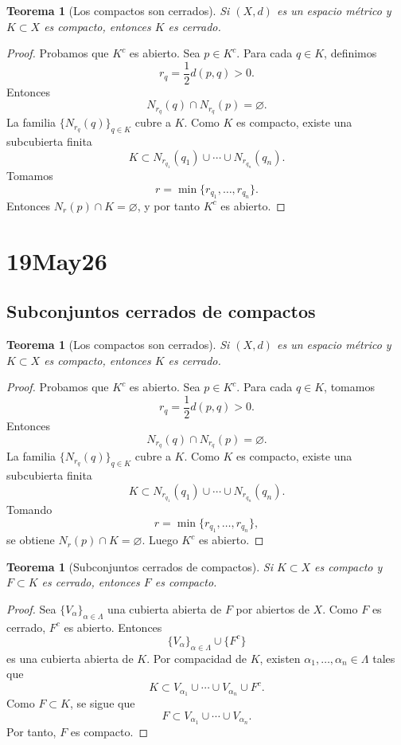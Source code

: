 \documentclass[12pt]{article}
\theoremstyle{definition}
\theoremstyle{plain}
\newtheorem{theorem}[definition]{Teorema}
\theoremstyle{remark}
\begin{document}
\begin{theorem}[Los compactos son cerrados]
Si $(X,d)$ es un espacio métrico y $K\subset X$ es compacto, entonces $K$ es cerrado.
\end{theorem}

\begin{proof}
Probamos que $K^c$ es abierto.
Sea $p\in K^c$.
Para cada $q\in K$, definimos
\[
r_q=\frac12 d(p,q)>0.
\]
Entonces
\[
N_{r_q}(q)\cap N_{r_q}(p)=\varnothing.
\]
La familia $\{N_{r_q}(q)\}_{q\in K}$ cubre a $K$.
Como $K$ es compacto, existe una subcubierta finita
\[
K\subset N_{r_{q_1}}(q_1)\cup\cdots\cup N_{r_{q_n}}(q_n).
\]
Tomamos
\[
r=\min\{r_{q_1},\dots,r_{q_n}\}.
\]
Entonces $N_r(p)\cap K=\varnothing$, y por tanto $K^c$ es abierto.
\end{proof}

\section*{19May26}

\subsection*{Subconjuntos cerrados de compactos}

\begin{theorem}[Los compactos son cerrados]
Si $(X,d)$ es un espacio métrico y $K\subset X$ es compacto, entonces $K$ es cerrado.
\end{theorem}

\begin{proof}
Probamos que $K^c$ es abierto.
Sea $p\in K^c$. Para cada $q\in K$, tomamos
\[
r_q=\frac12 d(p,q)>0.
\]
Entonces
\[
N_{r_q}(q)\cap N_{r_q}(p)=\varnothing.
\]
La familia $\{N_{r_q}(q)\}_{q\in K}$ cubre a $K$.
Como $K$ es compacto, existe una subcubierta finita
\[
K\subset N_{r_{q_1}}(q_1)\cup\cdots\cup N_{r_{q_n}}(q_n).
\]
Tomando
\[
r=\min\{r_{q_1},\dots,r_{q_n}\},
\]
se obtiene $N_r(p)\cap K=\varnothing$.
Luego $K^c$ es abierto.
\end{proof}

\begin{theorem}[Subconjuntos cerrados de compactos]
Si $K\subset X$ es compacto y $F\subset K$ es cerrado, entonces $F$ es compacto.
\end{theorem}

\begin{proof}
Sea $\{V_\alpha\}_{\alpha\in\Lambda}$ una cubierta abierta de $F$ por abiertos de $X$.
Como $F$ es cerrado, $F^c$ es abierto.
Entonces
\[
\{V_\alpha\}_{\alpha\in\Lambda}\cup\{F^c\}
\]
es una cubierta abierta de $K$.
Por compacidad de $K$, existen $\alpha_1,\dots,\alpha_n\in\Lambda$ tales que
\[
K\subset V_{\alpha_1}\cup\cdots\cup V_{\alpha_n}\cup F^c.
\]
Como $F\subset K$, se sigue que
\[
F\subset V_{\alpha_1}\cup\cdots\cup V_{\alpha_n}.
\]
Por tanto, $F$ es compacto.
\end{proof}
\end{document}
